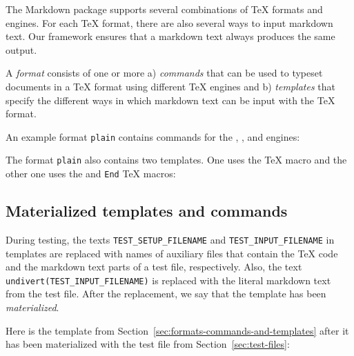 \documentclass[final]{ltugboat}
\begin{document}
The Markdown package supports several combinations of \TeX{} formats and engines. For each \TeX{} format, there are also several ways to input markdown text. Our framework ensures that a markdown text always produces the same output.

A \emph{format} consists of one or more a) \emph{commands} that can be used to typeset documents in a \TeX{} format using different \TeX{} engines and b) \emph{templates} that specify the different ways in which markdown text can be input with the \TeX{} format.

An example format \texttt{plain} contains commands for the , , and  engines:

\smallskip
\noindent
\addtocounter{footnote}{1}%
%

\smallskip
\noindent
The format \texttt{plain} also contains two templates. One uses the  \TeX{} macro and the other one uses the  and \texttt{End} \TeX{} macros:

\medskip
\noindent
{}

\medskip
\exampleSeparator

\medskip
\noindent
{}

\subsection{Materialized templates and commands}
\label{sec:materialized-templates-and-commands}

During testing, the texts {\small\texttt{TEST\_SETUP\_FILENAME}} and {\small\texttt{TEST\_INPUT\_FILENAME}} in templates are replaced with names of auxiliary files that contain the \TeX{} code and the markdown text parts of a test file, respectively. Also, the text {\small\texttt{undivert(TEST\_INPUT\_FILENAME)}} is replaced with the literal markdown text from the test file. After the replacement, we say that the template has been \emph{materialized}.

Here is the template  from Section~\ref{sec:formats-commands-and-templates} after it has been materialized with the test file  from Section~\ref{sec:test-files}:
\end{document}
